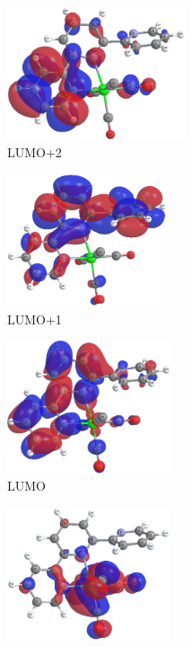\begin{figure}[!ht]
 \centering
 \begin{subfigure}[b]{0.31\textwidth}
  \includegraphics[clip=true, width=\textwidth, height=39mm, keepaspectratio]{images/mos/5l+2.eps}
  \caption{LUMO+2}
 \end{subfigure}
  \begin{subfigure}[b]{0.31\textwidth}
  \includegraphics[clip=true, width=\textwidth, height=39mm, keepaspectratio]{images/mos/5l+1.eps}
  \caption{LUMO+1}
 \end{subfigure}
  \begin{subfigure}[b]{0.31\textwidth}
  \includegraphics[clip=true, width=\textwidth, height=39mm, keepaspectratio]{images/mos/5l.eps}
  \caption{LUMO}
 \end{subfigure}
 \begin{subfigure}[b]{0.31\textwidth}
  \includegraphics[clip=true, width=\textwidth, height=39mm, keepaspectratio]{images/mos/5h.eps}

\end{subfigure}
\end{figure}
